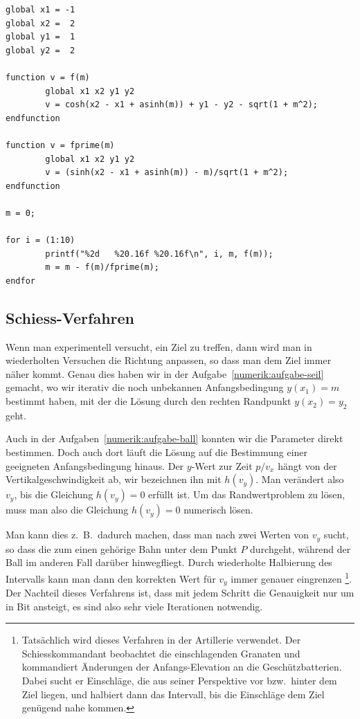 \begin{lstlisting}[style=Octave,caption={Octave-Programm zur Bestimmung der Anfangssteigung $m$ im Kettenlinien-Problem}, captionpos={t}, label={numerik:ketteprog}]
global x1 = -1
global x2 =  2
global y1 =  1
global y2 =  2

function v = f(m)
        global x1 x2 y1 y2
        v = cosh(x2 - x1 + asinh(m)) + y1 - y2 - sqrt(1 + m^2);
endfunction

function v = fprime(m)
        global x1 x2 y1 y2
        v = (sinh(x2 - x1 + asinh(m)) - m)/sqrt(1 + m^2);
endfunction

m = 0;

for i = (1:10)
        printf("%2d   %20.16f %20.16f\n", i, m, f(m));
        m = m - f(m)/fprime(m);
endfor
\end{lstlisting}

\subsection{Schiess-Verfahren\label{numerik:schiess-verfahren}}
%
Wenn man experimentell versucht, ein Ziel zu treffen, dann wird man
in wiederholten Versuchen die Richtung anpassen, so dass man dem Ziel
immer näher kommt.
Genau dies haben wir in der Aufgabe~\ref{numerik:aufgabe-seil} gemacht,
wo wir iterativ die noch unbekannen Anfangsbedingung $y(x_1)=m$ bestimmt
haben, mit der die Lösung durch den rechten Randpunkt $y(x_2)=y_2$ geht.

Auch in der Aufgaben~\ref{numerik:aufgabe-ball} konnten wir die
Parameter direkt bestimmen.
Doch auch dort läuft die Lösung auf die Bestimmung einer 
geeigneten Anfangsbedingung hinaus.
Der $y$-Wert zur Zeit $p/v_x$ hängt von der Vertikalgeschwindigkeit ab,
wir bezeichnen ihn mit $h(v_y)$.
Man verändert also $v_y$, bis die Gleichung $h(v_y)=0$ erfüllt ist.
Um das Randwertproblem zu lösen, muss man also die Gleichung $h(v_y)=0$
numerisch lösen.

Man kann dies z.~B.~dadurch machen, dass man nach zwei Werten von $v_y$
sucht, so dass die zum einen gehörige Bahn unter dem Punkt $P$ durchgeht,
während der Ball im anderen Fall darüber hinwegfliegt.
Durch wiederholte Halbierung des Intervalls kann man dann den korrekten
Wert für $v_y$ immer genauer eingrenzen%
\footnote{%
Tatsächlich wird dieses Verfahren in der Artillerie verwendet.
%
Der Schiesskommandant beobachtet die einschlagenden Granaten und kommandiert
Änderungen der Anfangs-Elevation an die Geschützbatterien.
Dabei sucht er Einschläge, die aus seiner Perspektive vor bzw.~hinter
dem Ziel liegen, und halbiert dann das Intervall, bis die Einschläge dem
Ziel genügend nahe kommen.}.
Der Nachteil dieses Verfahrens ist, dass mit jedem Schritt die Genauigkeit
nur um in Bit ansteigt, es sind also sehr viele Iterationen notwendig.

